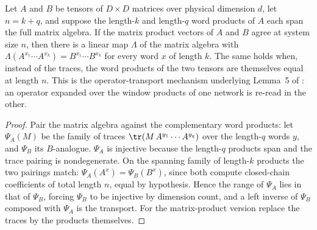 \begin{lemma}%
    \label{lem:exists_mpvTransport}
    \leanok
    Let $A$ and $B$ be tensors of $D \times D$ matrices over physical
    dimension $d$, let $n = k + q$, and suppose the length-$k$ and
    length-$q$ word products of $A$ each span the full matrix algebra.  If
    the matrix product vectors of $A$ and $B$ agree at system size $n$,
    then there is a linear map $\Lambda$ of the matrix algebra with
    $\Lambda(A^{x_1} \cdots A^{x_k}) = B^{x_1} \cdots B^{x_k}$ for every
    word $x$ of length $k$.  The same holds when, instead of the traces,
    the word products of the two tensors are themselves equal at length
    $n$.  This is the operator-transport mechanism underlying Lemma~5 of
    \cite{Molnar2018NormalPEPS}: an operator expanded over the window
    products of one network is re-read in the other.
\end{lemma}
\begin{proof}\leanok
    Pair the matrix algebra against the complementary word products: let
    $\Psi_A(M)$ be the family of traces
    $\tr(M\,A^{y_1} \cdots A^{y_q})$ over the length-$q$ words $y$, and
    $\Psi_B$ its $B$-analogue.  $\Psi_A$ is injective because the length-$q$
    products span and the trace pairing is nondegenerate.  On the spanning
    family of length-$k$ products the two pairings match:
    $\Psi_A(A^{x}) = \Psi_B(B^{x})$, since both compute closed-chain
    coefficients of total length $n$, equal by hypothesis.  Hence the range
    of $\Psi_A$ lies in that of $\Psi_B$, forcing $\Psi_B$ to be injective
    by dimension count, and a left inverse of $\Psi_B$ composed with
    $\Psi_A$ is the transport.  For the matrix-product version replace the
    traces by the products themselves.
\end{proof}

